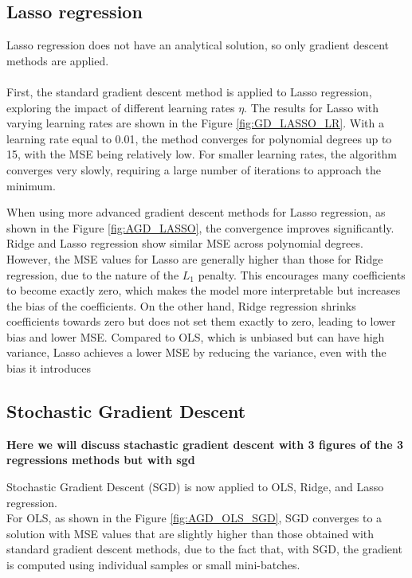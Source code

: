 \documentclass[
 reprint,            %
 amsmath,amssymb,
 aps,
]{revtex4-2}
\begin{document}


\subsection{Lasso regression}
Lasso regression does not have an analytical solution, so only gradient descent methods are applied.\\\\
First, the standard gradient descent method is applied to Lasso regression, exploring the impact of different learning rates $\eta$. 
The results for Lasso with varying learning rates are shown in the Figure \ref{fig:GD_LASSO_LR}.
With a learning rate equal to 0.01, the method converges for polynomial degrees up to 15, with the MSE being relatively low.
For smaller learning rates, the algorithm converges very slowly, requiring a large number of iterations to approach the minimum.


When using more advanced gradient descent methods for Lasso regression, as shown in the Figure \ref{fig:AGD_LASSO}, the convergence improves significantly.
Ridge and Lasso regression show similar MSE across polynomial degrees.
However, the MSE values for Lasso are generally higher than those for Ridge regression, due to the nature of the $L_1$ penalty. 
This encourages many coefficients to become exactly zero, which makes the model more interpretable but increases the bias of the coefficients.
On the other hand, Ridge regression shrinks coefficients towards zero but does not set them exactly to zero, leading to lower bias and lower MSE.
Compared to OLS, which is unbiased but can have high variance, Lasso achieves a lower MSE by reducing the variance, even with the bias it introduces


\subsection{Stochastic Gradient Descent}

\textbf{Here we will discuss stachastic gradient descent with 3 figures of the 3 regressions methods but with sgd}

Stochastic Gradient Descent (SGD) is now applied to OLS, Ridge, and Lasso regression.\\
For OLS, as shown in the Figure \ref{fig:AGD_OLS_SGD}, SGD converges to a solution with MSE values that are slightly higher than those obtained with standard gradient descent methods, 
due to the fact that, with SGD, the gradient is computed using individual samples or small mini-batches.           
           
\end{document}
